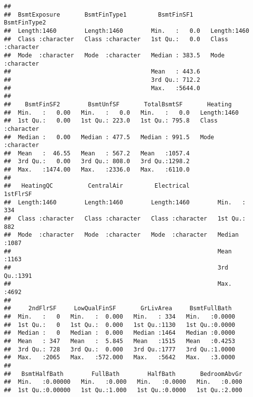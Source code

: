 \documentclass[]{article}
\begin{document}
\begin{verbatim}
##                                                          
##  BsmtExposure       BsmtFinType1         BsmtFinSF1     BsmtFinType2      
##  Length:1460        Length:1460        Min.   :   0.0   Length:1460       
##  Class :character   Class :character   1st Qu.:   0.0   Class :character  
##  Mode  :character   Mode  :character   Median : 383.5   Mode  :character  
##                                        Mean   : 443.6                     
##                                        3rd Qu.: 712.2                     
##                                        Max.   :5644.0                     
##                                                                           
##    BsmtFinSF2        BsmtUnfSF       TotalBsmtSF       Heating         
##  Min.   :   0.00   Min.   :   0.0   Min.   :   0.0   Length:1460       
##  1st Qu.:   0.00   1st Qu.: 223.0   1st Qu.: 795.8   Class :character  
##  Median :   0.00   Median : 477.5   Median : 991.5   Mode  :character  
##  Mean   :  46.55   Mean   : 567.2   Mean   :1057.4                     
##  3rd Qu.:   0.00   3rd Qu.: 808.0   3rd Qu.:1298.2                     
##  Max.   :1474.00   Max.   :2336.0   Max.   :6110.0                     
##                                                                        
##   HeatingQC          CentralAir         Electrical           1stFlrSF   
##  Length:1460        Length:1460        Length:1460        Min.   : 334  
##  Class :character   Class :character   Class :character   1st Qu.: 882  
##  Mode  :character   Mode  :character   Mode  :character   Median :1087  
##                                                           Mean   :1163  
##                                                           3rd Qu.:1391  
##                                                           Max.   :4692  
##                                                                         
##     2ndFlrSF     LowQualFinSF       GrLivArea     BsmtFullBath   
##  Min.   :   0   Min.   :  0.000   Min.   : 334   Min.   :0.0000  
##  1st Qu.:   0   1st Qu.:  0.000   1st Qu.:1130   1st Qu.:0.0000  
##  Median :   0   Median :  0.000   Median :1464   Median :0.0000  
##  Mean   : 347   Mean   :  5.845   Mean   :1515   Mean   :0.4253  
##  3rd Qu.: 728   3rd Qu.:  0.000   3rd Qu.:1777   3rd Qu.:1.0000  
##  Max.   :2065   Max.   :572.000   Max.   :5642   Max.   :3.0000  
##                                                                  
##   BsmtHalfBath        FullBath        HalfBath       BedroomAbvGr  
##  Min.   :0.00000   Min.   :0.000   Min.   :0.0000   Min.   :0.000  
##  1st Qu.:0.00000   1st Qu.:1.000   1st Qu.:0.0000   1st Qu.:2.000  

\end{verbatim}
\end{document}

